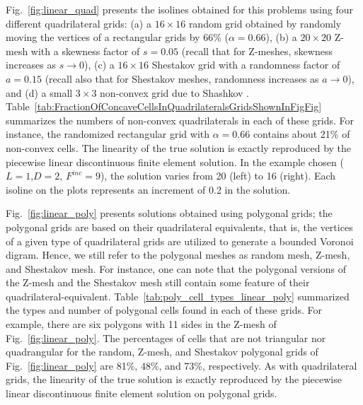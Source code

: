 \documentclass[preprint,10pt]{elsarticle}
\newcommand{\fig}[1]{Fig.~\ref{#1}}                      %
\newcommand{\tbl}[1]{Table~\ref{#1}}                     %
\begin{document}
\fig{fig:linear_quad} presents the isolines obtained for this problems using four different quadrilateral grids:
(a) a $16 \times 16$ random grid obtained by randomly moving the vertices of a rectangular grids by 66\% ($\alpha=0.66$), 
(b) a $20 \times 20$ Z-mesh with a skewness factor of $s=0.05$ (recall that for Z-meshes, skewness increases
as $s\to 0$), 
(c) a $16 \times 16$ Shestakov grid  with a randomness factor of $a=0.15$ (recall also that for Shestakov meshes, 
randomness increases as $a\to 0$), and 
(d) a small $3 \times 3$ non-convex grid due to Shashkov \cite{ShashkovSteinberg1996}.
\tbl{tab:FractionOfConcaveCellsInQuadrilateralsGridsShownInFigFig} summarizes the numbers of non-convex quadrilaterals in each of these grids.  For instance, the randomized rectangular grid with $\alpha=0.66$ contains about 21\% of non-convex cells. 
The linearity of the true solution is exactly reproduced by the piecewise linear discontinuous finite element solution. In the example chosen ($L=1$,$D=2$, $F^{inc}=9$), the solution varies from 20 (left) to 16 (right). Each isoline on the plots represents an increment of 0.2 in the solution.

\fig{fig:linear_poly} presents solutions obtained using polygonal grids; the polygonal grids are based on their quadrilateral equivalents, that is, the vertices of a given type of quadrilateral grids are utilized to generate a bounded Voronoi digram. Hence, we still refer to the polygonal meshes as random mesh, Z-mesh, and Shestakov mesh. For instance, one can note that the polygonal versions of the Z-mesh and the Shestakov mesh still contain some feature of their quadrilateral-equivalent. \tbl{tab:poly_cell_types_linear_poly} summarized the types and number of polygonal cells found in each of these grids. 
For example, there are six polygons with 11 sides in the Z-mesh of \fig{fig:linear_poly}. The percentages of cells that are not triangular nor quadrangular for the random, Z-mesh, and Shestakov polygonal grids of \fig{fig:linear_poly} are 81\%, 48\%, and 73\%, respectively. As with quadrilateral grids, the linearity of the true solution is exactly reproduced by the piecewise linear discontinuous finite element solution on polygonal grids.
\end{document}
